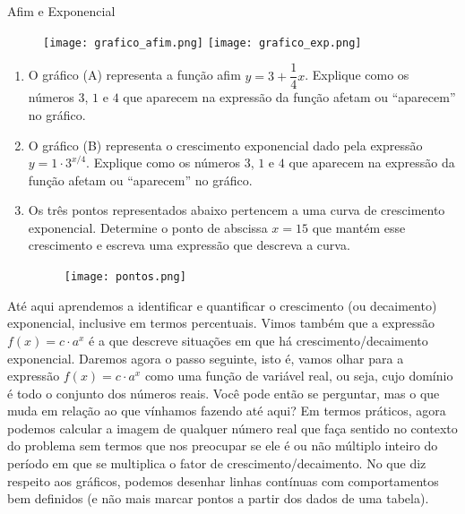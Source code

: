 \begin{task}{Afim e Exponencial}


\begin{figure}[H]
\centering
\texttt{[image: grafico\_afim.png]}
\texttt{[image: grafico\_exp.png]}
\end{figure}

\begin{enumerate}

\item{} O gráfico (A) representa a função afim $y=3+\dfrac{1}{4}x$. Explique como os números $3$, $1$ e $4$ que aparecem na expressão da função afetam ou “aparecem” no gráfico.

\item{} O gráfico (B) representa o crescimento exponencial dado pela expressão $y=1 \cdot 3^{x/4}$. Explique como os números $3$, $1$ e $4$ que aparecem na expressão da função afetam ou “aparecem” no gráfico.

\item{} Os três pontos representados abaixo pertencem a uma curva de crescimento exponencial. Determine o ponto de abscissa $x=15$ que mantém esse crescimento e escreva uma expressão que descreva a curva.

\begin{figure}[H]
\centering
\texttt{[image: pontos.png]}
\end{figure}

\end{enumerate}

\end{task}



Até aqui aprendemos a identificar e quantificar o crescimento (ou decaimento) exponencial, inclusive em termos percentuais. Vimos também que a expressão $f(x) = c \cdot a^{x}$ é a que descreve situações em que há crescimento/decaimento exponencial. Daremos agora o passo seguinte, isto é, vamos olhar para a expressão $f(x) = c \cdot a^{x}$ como uma função de variável real, ou seja, cujo domínio é todo o conjunto dos números reais. Você pode então se perguntar, mas o que muda em relação ao que vínhamos fazendo até aqui? Em termos práticos, agora podemos calcular a imagem de qualquer número real que faça sentido no contexto do problema sem termos que nos preocupar se ele é ou não múltiplo inteiro do período em que se multiplica o fator de crescimento/decaimento. No que diz respeito aos gráficos, podemos desenhar linhas contínuas com comportamentos bem definidos (e não mais marcar pontos a partir dos dados de uma tabela).

